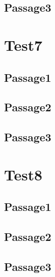 \documentclass[conference]{IEEEtran}
\begin{document}
\subsection{Passage3}

\section{Test7}

\subsection{Passage1}
\subsection{Passage2}
\subsection{Passage3}

\section{Test8}

\subsection{Passage1}
\subsection{Passage2}
\subsection{Passage3}
\end{document}
